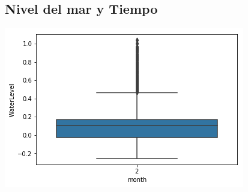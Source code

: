 \documentclass{article}
\begin{document}
\begin{figure}
\subsection{Nivel del mar y Tiempo}
\includegraphics[width=\linewidth]{water-time.png}
\end{figure}
\end{document}
